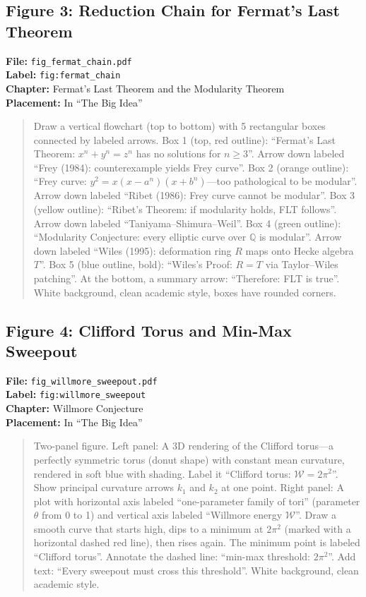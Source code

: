 \subsection*{Figure 3: Reduction Chain for Fermat's Last Theorem}
\textbf{File:} \texttt{fig\_fermat\_chain.pdf} \\
\textbf{Label:} \texttt{fig:fermat\_chain} \\
\textbf{Chapter:} Fermat's Last Theorem and the Modularity Theorem \\
\textbf{Placement:} In ``The Big Idea''

\begin{quote}
Draw a vertical flowchart (top to bottom) with 5 rectangular boxes connected by labeled arrows. Box 1 (top, red outline): ``Fermat's Last Theorem: $x^n + y^n = z^n$ has no solutions for $n \geq 3$''. Arrow down labeled ``Frey (1984): counterexample yields Frey curve''. Box 2 (orange outline): ``Frey curve: $y^2 = x(x{-}a^n)(x{+}b^n)$---too pathological to be modular''. Arrow down labeled ``Ribet (1986): Frey curve cannot be modular''. Box 3 (yellow outline): ``Ribet's Theorem: if modularity holds, FLT follows''. Arrow down labeled ``Taniyama--Shimura--Weil''. Box 4 (green outline): ``Modularity Conjecture: every elliptic curve over $\mathbb{Q}$ is modular''. Arrow down labeled ``Wiles (1995): deformation ring $R$ maps onto Hecke algebra $T$''. Box 5 (blue outline, bold): ``Wiles's Proof: $R = T$ via Taylor--Wiles patching''. At the bottom, a summary arrow: ``Therefore: FLT is true''. White background, clean academic style, boxes have rounded corners.
\end{quote}

\subsection*{Figure 4: Clifford Torus and Min-Max Sweepout}
\textbf{File:} \texttt{fig\_willmore\_sweepout.pdf} \\
\textbf{Label:} \texttt{fig:willmore\_sweepout} \\
\textbf{Chapter:} Willmore Conjecture \\
\textbf{Placement:} In ``The Big Idea''

\begin{quote}
Two-panel figure. Left panel: A 3D rendering of the Clifford torus---a perfectly symmetric torus (donut shape) with constant mean curvature, rendered in soft blue with shading. Label it ``Clifford torus: $\mathcal{W} = 2\pi^2$''. Show principal curvature arrows $k_1$ and $k_2$ at one point. Right panel: A plot with horizontal axis labeled ``one-parameter family of tori'' (parameter $\theta$ from 0 to 1) and vertical axis labeled ``Willmore energy $\mathcal{W}$''. Draw a smooth curve that starts high, dips to a minimum at $2\pi^2$ (marked with a horizontal dashed red line), then rises again. The minimum point is labeled ``Clifford torus''. Annotate the dashed line: ``min-max threshold: $2\pi^2$''. Add text: ``Every sweepout must cross this threshold''. White background, clean academic style.
\end{quote}

